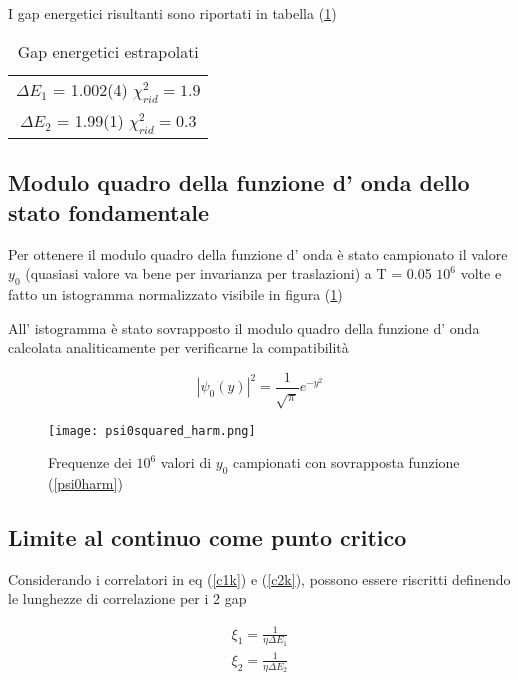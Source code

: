 \documentclass{article}
\begin{document}
I gap energetici risultanti sono riportati in tabella (\ref{deltaEestrap})

\begin{table}[h]
\centering
\begin{tabular}{c}

$\Delta E_1$ = 1.002(4) $\chi^2_{rid}=1.9$                                   \\

$\Delta E_2$ = 1.99(1) $\chi^2_{rid}=0.3$ \\ 
\hline
\end{tabular}
\caption{Gap energetici estrapolati}
\label{deltaEestrap}
\end{table}

\subsection{Modulo quadro della funzione d' onda dello stato fondamentale}

Per ottenere il modulo quadro della funzione d' onda è stato campionato il valore $y_0$ (quasiasi valore va bene per invarianza per traslazioni) a T = 0.05 $10^6$ volte e fatto un istogramma normalizzato visibile in figura (\ref{fig:psi0harm})

All' istogramma è stato sovrapposto il modulo quadro della funzione d' onda calcolata analiticamente per verificarne la compatibilità

\begin{equation}
    |\psi_0(y)|^2 = \frac{1}{\sqrt{\pi}}e^{-y^2}
    \label{psi0harm}
\end{equation}

\begin{figure}[h]
    \centering
    \texttt{[image: psi0squared\_harm.png]}
    \caption{Frequenze dei $10^6$ valori di $y_0$ campionati con sovrapposta funzione (\ref{psi0harm})}
    \label{fig:psi0harm}
\end{figure}

\subsection{Limite al continuo come punto critico}

Considerando i correlatori in eq (\ref{c1k}) e (\ref{c2k}), possono essere riscritti definendo le lunghezze di correlazione per i 2 gap 

\begin{equation}
\begin{split}
    \xi _1 = \frac{1}{\eta \Delta E_1}\\
    \xi _2 = \frac{1}{\eta \Delta E_2}
    \label{csi}
    \end{split}
\end{equation}
\end{document}
